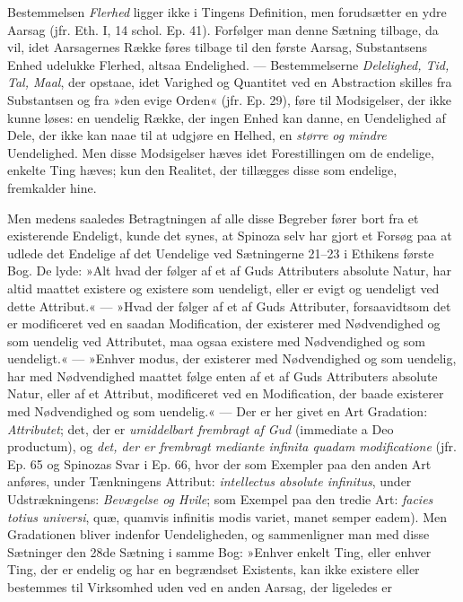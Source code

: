 \documentclass[12pt,a4paper]{book}
\newcommand{\opage}[1]{\marginnote{\footnotesize\textit{[#1]}}}
\begin{document}
Bestemmelsen \emph{Flerhed} ligger ikke i Tingens Definition, men
forudsætter en ydre Aarsag (jfr. Eth. I, 14 schol. Ep. 41). Forfølger
man denne Sætning tilbage, da vil, idet Aarsagernes Række føres
tilbage til den første Aarsag, Substantsens Enhed udelukke Flerhed,
altsaa Endelighed. --- Bestemmelserne \emph{Delelighed, Tid, Tal, Maal}, der
opstaae, idet Varighed og Quantitet ved en Abstraction skilles fra
Substantsen og fra »den evige Orden« (jfr. Ep. 29), føre til
Modsigelser, der ikke kunne løses: en uendelig Række, der ingen Enhed
kan danne, en Uendelighed af Dele, der ikke kan naae til at udgjøre
en Helhed, en \emph{større og mindre} Uendelighed. Men disse
Modsigelser hæves idet Forestillingen om de endelige, enkelte Ting
hæves; kun den Realitet, der tillægges disse som endelige, fremkalder
hine.

Men medens saaledes Betragtningen af alle disse Begreber fører bort
fra et existerende Endeligt, kunde det synes, at Spinoza selv har
gjort et Forsøg paa at udlede det Endelige af det Uendelige ved
Sætningerne 21--23 i Ethikens første Bog. De lyde: »Alt hvad der
følger af et af Guds Attributers absolute Natur, har altid maattet
existere og existere som uendeligt, eller er evigt og uendeligt ved
dette Attribut.« --- »Hvad der følger af et af Guds Attributer,
forsaavidtsom det er modificeret ved en saadan Modification, der
existerer med Nødvendighed og som uendelig ved Attributet, maa ogsaa
existere med Nødvendighed og som uendeligt.« --- »Enhver modus, der
existerer med Nødvendighed og som uendelig, har med Nødvendighed
maattet følge enten af et af Guds Attributers absolute Natur, eller af
et Attribut, modificeret ved en Modification, der baade existerer med
Nødvendighed og som uendelig.« --- Der er her givet en Art Gradation:
\emph{Attributet}; det, der er \emph{umiddelbart frembragt af Gud} (immediate
a Deo productum), og \emph{det, der er frembragt mediante infinita
quadam modificatione} (jfr. Ep. 65 og Spinozas Svar i
\opage{59} Ep. 66, hvor der som Exempler paa den anden Art anføres, under
Tænkningens Attribut: \emph{intellectus absolute infinitus}, under
Udstrækningens: \emph{Bevægelse og Hvile}; som Exempel paa den tredie
Art: \emph{facies totius universi}, quæ, quamvis infinitis modis
variet, manet semper eadem). Men Gradationen bliver indenfor
Uendeligheden, og sammenligner man med disse Sætninger den 28de
Sætning i samme Bog: »Enhver enkelt Ting, eller enhver Ting, der er
endelig og har en begrændset Existents, kan ikke existere eller
bestemmes til Virksomhed uden ved en anden Aarsag, der ligeledes er
\end{document}
